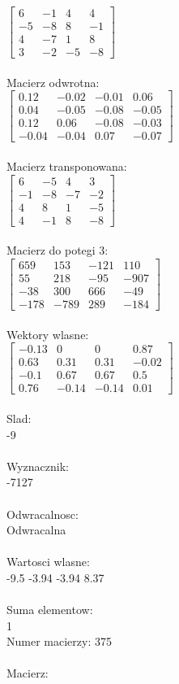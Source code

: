 \documentclass[a4paper,12pt]{article}
\begin{document}
$\begin{bmatrix} 6&-1&4&4\\-5&-8&8&-1\\4&-7&1&8\\3&-2&-5&-8 \end{bmatrix}$
\\
\\
Macierz odwrotna:\\

$\begin{bmatrix} 0.12&-0.02&-0.01&0.06\\0.04&-0.05&-0.08&-0.05\\0.12&0.06&-0.08&-0.03\\-0.04&-0.04&0.07&-0.07 \end{bmatrix}$
\\
\\
Macierz transponowana:\\

$\begin{bmatrix} 6&-5&4&3\\-1&-8&-7&-2\\4&8&1&-5\\4&-1&8&-8 \end{bmatrix}$
\\
\\
Macierz do potegi 3:\\

$\begin{bmatrix} 659&153&-121&110\\55&218&-95&-907\\-38&300&666&-49\\-178&-789&289&-184 \end{bmatrix}$
\\
\\
Wektory wlasne:\\

$\begin{bmatrix} -0.13&0&0&0.87\\0.63&0.31&0.31&-0.02\\-0.1&0.67&0.67&0.5\\0.76&-0.14&-0.14&0.01 \end{bmatrix}$
\\
\\
Slad:\\
-9
\\
\\
Wyznacznik:\\
-7127
\\
\\
Odwracalnosc:\\
Odwracalna
\\
\\
Wartosci wlasne:\\
-9.5 -3.94 -3.94 8.37
\\
\\
Suma elementow:\\
1
\\
\newpage
Numer macierzy:
375
\\
\\
Macierz:\\
\end{document}
